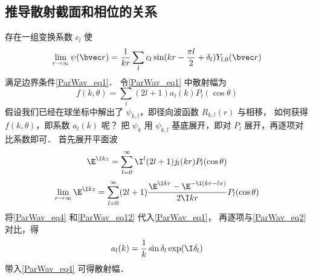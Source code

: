 \subsection{推导散射截面和相位的关系}
存在一组变换系数 $c_l$ 使
\begin{equation}\label{ParWav_eq2}
\lim_{r\to\infty}\psi(\bvec r) = \frac{1}{kr} \sum_l c_l \sin(kr - \frac{\pi l}{2} + \delta_l) Y_{l,0}(\bvec r)
\end{equation}
满足边界条件\autoref{ParWav_eq1}． 令\autoref{ParWav_eq1} 中散射幅为
\begin{equation}\label{ParWav_eq4}
f(k,\theta) = \sum_l (2l + 1) a_l(k) P_l(\cos \theta)
\end{equation}
假设我们已经在球坐标中解出了 $\psi_{k,l}$，即径向波函数 $R_{k,l}(r)$ 与相移， 如何获得 $f(k,\theta )$，即系数 $a_l(k)$ 呢？ 把 $\psi_k$ 用 $\psi_{k,l}$ 基底展开，即对 $P_l$ 展开，再逐项对比系数即可． 首先展开平面波
\begin{equation}
\E^{\I kz} = \sum_{l = 0}^\infty  \I^l (2l + 1) j_l(kr) P_l(\cos \theta)
\end{equation}
\begin{equation}\label{ParWav_eq12}
\lim_{r\to\infty}\E^{\I kz} = \sum_{l=0}^\infty  (2l + 1)\frac{\E^{\I kr} - \E^{-\I(kr - l\pi)}}{2\I kr} P_l(\cos \theta)
\end{equation}
将\autoref{ParWav_eq4} 和\autoref{ParWav_eq12} 代入\autoref{ParWav_eq1}， 再逐项与\autoref{ParWav_eq2} 对比，得
\begin{equation}
a_l(k) = \frac{1}{k} \sin\delta_l \exp(\I \delta_l)
\end{equation}
带入\autoref{ParWav_eq4} 可得散射幅．
